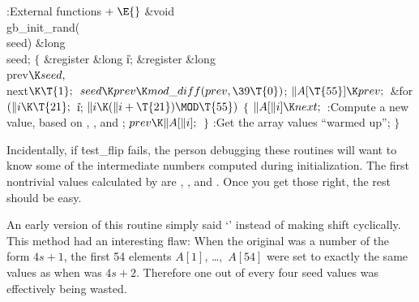 \Y\B\4:External functions\X${}\mathrel+\E{}$\6
\1\1\&{void} \\{gb\_init\_rand}(\\{seed})\6
\&{long} \\{seed};\2\2\6
${}\{{}$\5
\1\&{register} \&{long} \|i;\6
\&{register} \&{long} \\{prev}${}\K\\{seed},{}$ \\{next}${}\K\T{1};{}$\7
${}\\{seed}\K\\{prev}\K\\{mod\_diff}(\\{prev},\39\T{0}){}$;\6
${}\|A[\T{55}]\K\\{prev};{}$\6
\&{for} ${}(\|i\K\T{21};{}$ \|i; ${}\|i\K(\|i+\T{21})\MOD\T{55}){}$\5
${}\{{}$\1\6
${}\|A[\|i]\K\\{next};{}$\6
:Compute a new  value, based on , ,
and \X;\6
${}\\{prev}\K\|A[\|i];{}$\6
\4${}\}{}$\2\6
:Get the array values ``warmed up''\X;\6
\4${}\}{}$\2\par
\fi

Incidentally, if \.{test\_flip} fails, the person debugging these
routines will want to know some of the intermediate numbers computed
during initialization.  The first nontrivial values calculated by
 are , , and
.  Once you get those right, the rest should
be easy.

An early version of this routine simply said `' instead
of making
 shift cyclically. This method had an interesting flaw:
When the original  was a number of the form $4s+1$, the first
54 elements $A[1]$, \dots,~$A[54]$ were set to exactly the same values
as when  was $4s+2$. Therefore one out of every four seed values
was effectively being wasted.

